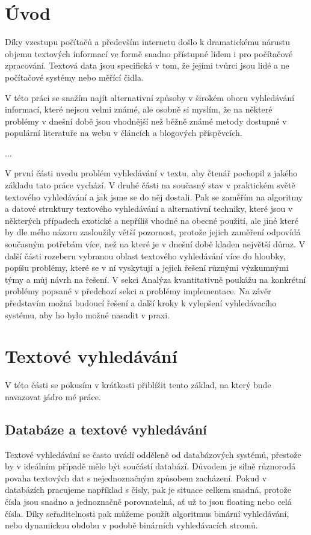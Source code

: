\documentclass[12pt]{article}
\begin{document}
\section{Úvod}
Díky vzestupu počítačů a především internetu došlo k dramatickému
nárustu objemu textových informací ve formě snadno přístupné lidem i pro
počítačové zpracování. Textová data jsou specifická v tom, že jejími
tvůrci jsou lidé a ne počítačové systémy nebo měřící čidla. 

V této práci se snažím najít alternativní způsoby v širokém oboru vyhledávání
informací, které nejsou velmi známé, ale osobně si myslím, že na některé
problémy v dnešní době jsou vhodnější než běžně známé metody dostupné v
populární literatuře na webu v článcích a blogových příspěvcích. 

...

V první části uvedu problém vyhledávání v textu, aby čtenář pochopil z jakého
základu tato práce vychází. V druhé části na současný stav v praktickém světě
textového vyhledávání a jak jsme se do něj dostali. Pak se zaměřím na algoritmy
a datové struktury textového vyhledávání a alternativní techniky, které jsou v
některých případech exotické a nepříliš vhodné na obecné použití, ale jiné
které by dle mého názoru zasloužily větší pozornost, protože jejich zaměření
odpovídá současným potřebám více, než na které je v dnešní době kladen největší
důraz. V další části rozeberu vybranou oblast textového vyhledávání více do
hloubky, popíšu problémy, které se v ní vyskytují a jejich řešení různými
výzkumnými týmy a můj návrh na řešení. V sekci Analýza kvantitativně poukážu na
konkrétní problémy popsané v předchozí sekci a problémy implementace. Na závěr
představím možná budoucí řešení a další kroky k vylepšení vyhledávacího
systému, aby ho bylo možné nasadit v praxi.

\section{Textové vyhledávání}
V této části
se pokusím v krátkosti přiblížit tento základ, na který bude navazovat jádro mé
práce.

\subsection{Databáze a textové vyhledávání}
Textové vyhledávání se často uvádí odděleně od databázových systémů, přestože
by v ideálním případě mělo být součástí databází. Důvodem je silně různorodá
povaha textových dat s nejednoznačným způsobem zacházení. Pokud v databázích
pracujeme například s čísly, pak je situace celkem snadná, protože čísla jsou
snadno a jednoznačně porovnatelná, ať už to jsou floating nebo celá čísla. Díky
seřaditelnosti pak můžeme použít algoritmus binární vyhledávání, nebo
dynamickou obdobu v podobě binárních vyhledávacích stromů.
\end{document}
